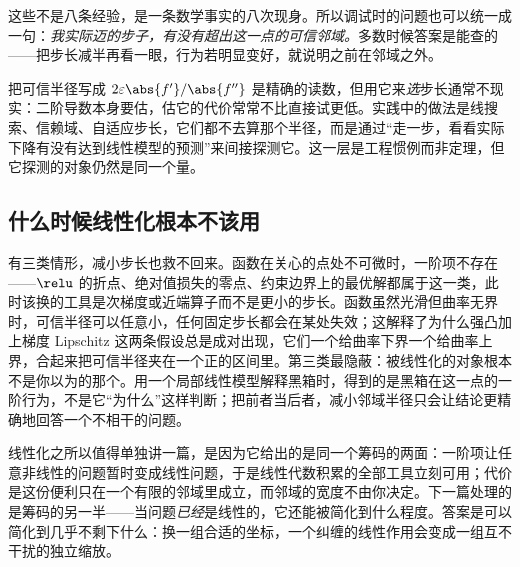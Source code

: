这些不是八条经验，是一条数学事实的八次现身。所以调试时的问题也可以统一成一句：\emph{我实际迈的步子，有没有超出这一点的可信邻域。}多数时候答案是能查的——把步长减半再看一眼，行为若明显变好，就说明之前在邻域之外。

\begin{remark}
把可信半径写成 \(2\varepsilon\abs{f'}/\abs{f''}\) 是精确的读数，但用它来\emph{选}步长通常不现实：二阶导数本身要估，估它的代价常常不比直接试更低。实践中的做法是线搜索、信赖域、自适应步长，它们都不去算那个半径，而是通过``走一步，看看实际下降有没有达到线性模型的预测''来间接探测它。这一层是工程惯例而非定理，但它探测的对象仍然是同一个量。
\end{remark}

\subsection{什么时候线性化根本不该用}

有三类情形，减小步长也救不回来。函数在关心的点处不可微时，一阶项不存在——\(\relu\) 的折点、绝对值损失的零点、约束边界上的最优解都属于这一类，此时该换的工具是次梯度或近端算子而不是更小的步长。函数虽然光滑但曲率无界时，可信半径可以任意小，任何固定步长都会在某处失效；这解释了为什么强凸加上梯度 Lipschitz 这两条假设总是成对出现，它们一个给曲率下界一个给曲率上界，合起来把可信半径夹在一个正的区间里。第三类最隐蔽：被线性化的对象根本不是你以为的那个。用一个局部线性模型解释黑箱时，得到的是黑箱在这一点的一阶行为，不是它``为什么''这样判断；把前者当后者，减小邻域半径只会让结论更精确地回答一个不相干的问题。

线性化之所以值得单独讲一篇，是因为它给出的是同一个筹码的两面：一阶项让任意非线性的问题暂时变成线性问题，于是线性代数积累的全部工具立刻可用；代价是这份便利只在一个有限的邻域里成立，而邻域的宽度不由你决定。下一篇处理的是筹码的另一半——当问题\emph{已经}是线性的，它还能被简化到什么程度。答案是可以简化到几乎不剩下什么：换一组合适的坐标，一个纠缠的线性作用会变成一组互不干扰的独立缩放。
